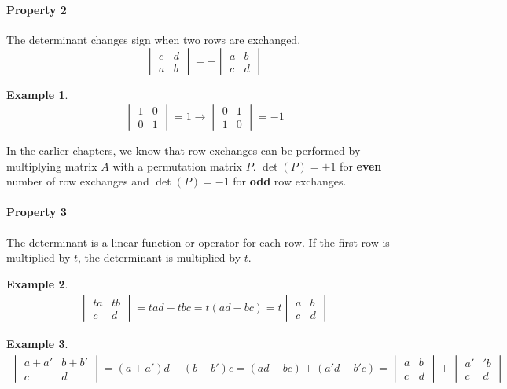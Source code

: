 \documentclass[12pt, letterpaper]{article}
\theoremstyle{definition}
\newtheorem{example}{Example}
\begin{document}
\paragraph{Property 2}
The determinant changes sign when two rows are exchanged.
	\[\begin{vmatrix}
		c & d\\
		a & b
	 \end{vmatrix} = - \begin{vmatrix}
						 a & b \\
						 c & d
						 \end{vmatrix}\]
	\begin{example}
		\[
		\begin{vmatrix}
		1 & 0 \\
		0 & 1
		\end{vmatrix} = 1 \rightarrow \begin{vmatrix}
										0 & 1 \\
										1 & 0
										\end{vmatrix} = -1
										\]
	\end{example}
	In the earlier chapters, we know that row exchanges can be performed by multiplying matrix $A$ with a permutation matrix $P$. $\det(P) = +1$ for \textbf{even} number of row exchanges and $\det(P) = -1$ for \textbf{odd} row exchanges.

\paragraph{Property 3}
The determinant is a linear function or operator for each row. If the first row is multiplied by $t$, the determinant is multiplied by $t$.
	\begin{example}
		\begin{gather*}
			\begin{vmatrix}
				ta & tb \\
				c & d		
			\end{vmatrix} = tad - tbc = t(ad - bc) = t \begin{vmatrix}
														a & b \\
														c & d		
														\end{vmatrix}
		\end{gather*}
	\end{example}
	
	
	\begin{example}
		\begin{gather*}
			\begin{vmatrix}
				a+a' & b+b' \\
				c & d		
			\end{vmatrix} = (a+a')d - (b+b')c = (ad-bc) + (a'd - b'c) = \begin{vmatrix}
																			a & b \\
																			c & d		
																			\end{vmatrix} + \begin{vmatrix}
																								a' & 'b \\
																								c & d		
																								\end{vmatrix}
		\end{gather*}
	\end{example}
\end{document}

